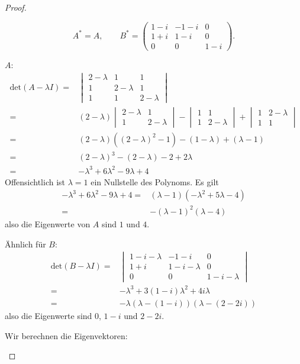 \begin{proof}
	\begin{parts}
	\item 
		\[
			A^*=A,\qquad B^*=\begin{pmatrix} 1 - i & -1-i & 0 \\ 1+i & 1-i & 0 \\ 0 & 0 & 1-i \end{pmatrix} 
		.\] 
	\item $A$:
		\begin{align*}
			\text{det}(A-\lambda I)=&
			\begin{vmatrix}
				2-\lambda & 1 & 1 \\ 1 & 2-\lambda & 1 \\ 1 & 1 & 2-\lambda
			\end{vmatrix}\\
			=&(2-\lambda)
			\begin{vmatrix}
				2-\lambda & 1 \\ 1 & 2-\lambda
			\end{vmatrix}
			-
			\begin{vmatrix}
				1 & 1 \\ 1 & 2-\lambda
			\end{vmatrix}
			+
			\begin{vmatrix}
				1 & 2-\lambda \\ 1 & 1
			\end{vmatrix}\\
			=&(2-\lambda)((2-\lambda)^2-1)-(1-\lambda)+(\lambda-1)\\
			=&(2-\lambda)^3-(2-\lambda)-2+2\lambda\\
			=&-\lambda^3+6\lambda^2-9\lambda+4
		\end{align*}
		Offensichtlich ist $\lambda=1$ ein Nullstelle des Polynoms. Es gilt
		\begin{align*}
			-\lambda^3+6\lambda^2-9\lambda+4=&(\lambda-1)(-\lambda^2+5\lambda-4)\\
			=&-(\lambda-1)^2(\lambda-4)
		\end{align*}
		also die Eigenwerte von $A$ sind $1$ und $4$.

		Ähnlich für $B$:
\begin{align*}
	\text{det}(B-\lambda I)=&
	\begin{vmatrix}
		1-i-\lambda & -1-i & 0 \\ 1+i & 1-i-\lambda & 0 \\ 0 & 0 & 1-i-\lambda
	\end{vmatrix}\\
	=&-\lambda^3+3(1-i)\lambda^2+4i\lambda\\
	=&-\lambda(\lambda-(1-i))(\lambda-(2-2i))
\end{align*}
also die Eigenwerte sind $0$, $1-i$ und $2-2i$.
\item Wir berechnen die Eigenvektoren:


\end{parts}
\end{proof}
